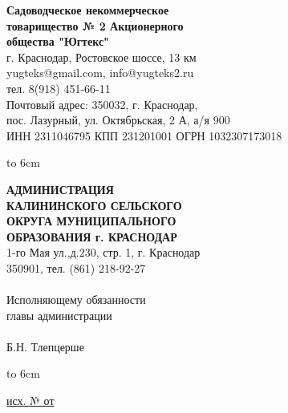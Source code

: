 \noindent\parbox[l][71mm]{80mm}
{
	 \begin{center}
 {\small \textbf{Садоводческое некоммерческое\\ товарищество
 	№  2 Акционерного\\ общества "Югтекс"\\
 }}
 \footnotesize{г. Краснодар, Ростовское шоссе, 13 км\\
 	yugteks@gmail.com, info@yugteks2.ru\\
 	тел. 8(918) 451-66-11\\
 	Почтовый адрес: 350032, г. Краснодар,\\ пос. Лазурный, ул. Октябрьская, 2 А, а/я   900
  }\\
 {ИНН 2311046795 КПП 231201001 ОГРН 1032307173018}
		\end{center}
\hbox to 6cm{ }}\hfill
\parbox[l][71mm]{65mm}
{ \begin{center}
  {\small \textbf{АДМИНИСТРАЦИЯ\\ КАЛИНИНСКОГО
 		СЕЛЬСКОГО\\ ОКРУГА МУНИЦИПАЛЬНОГО\\
 		ОБРАЗОВАНИЯ г. КРАСНОДАР\\
 }}
 \footnotesize{1-го Мая ул.,д.230, стр. 1, г. Краснодар\\
 350901, тел. (861) 218-92-27\\
 {  }\\
{\normalsize  	 Исполняющему обязанности\\
 	главы администрации\\}
 	{  }\\
 {\normalsize 	Б.Н. Тлепцерше}
 }\\
 { }
\end{center}
\hbox to 6cm{ }}
\linebreak
\vspace{-12mm}

\underline{исх. №  от } 